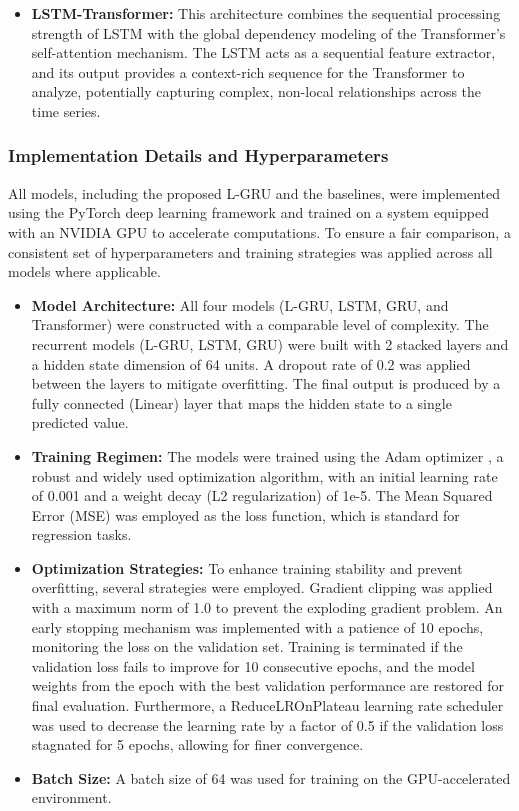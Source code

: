 \documentclass{cys}
\begin{document}
\begin{enumerate}
\begin{itemize}
        \item \textbf{LSTM-Transformer:}
        This architecture combines the sequential processing strength of LSTM with the global dependency modeling of the Transformer's self-attention mechanism. The LSTM acts as a sequential feature extractor, and its output provides a context-rich sequence for the Transformer to analyze, potentially capturing complex, non-local relationships across the time series.
    \end{itemize}

    
\subsubsection{Implementation Details and Hyperparameters}
    
    All models, including the proposed L-GRU and the baselines, were implemented using the PyTorch deep learning framework and trained on a system equipped with an NVIDIA GPU to accelerate computations. To ensure a fair comparison, a consistent set of hyperparameters and training strategies was applied across all models where applicable.
    \begin{itemize}
        \item \textbf{Model Architecture:}
        All four models (L-GRU, LSTM, GRU, and Transformer) were constructed with a comparable level of complexity. The recurrent models (L-GRU, LSTM, GRU) were built with 2 stacked layers and a hidden state dimension of 64 units. A dropout rate of 0.2 was applied between the layers to mitigate overfitting. The final output is produced by a fully connected (Linear) layer that maps the hidden state to a single predicted value.
        \item \textbf{Training Regimen:}
        The models were trained using the Adam optimizer \cite{kingma2014adam}, a robust and widely used optimization algorithm, with an initial learning rate of 0.001 and a weight decay (L2 regularization) of 1e-5. The Mean Squared Error (MSE) was employed as the loss function, which is standard for regression tasks.
        \item \textbf{Optimization Strategies:}
        To enhance training stability and prevent overfitting, several strategies were employed. Gradient clipping was applied with a maximum norm of 1.0 to prevent the exploding gradient problem. An early stopping mechanism was implemented with a patience of 10 epochs, monitoring the loss on the validation set. Training is terminated if the validation loss fails to improve for 10 consecutive epochs, and the model weights from the epoch with the best validation performance are restored for final evaluation. Furthermore, a ReduceLROnPlateau learning rate scheduler was used to decrease the learning rate by a factor of 0.5 if the validation loss stagnated for 5 epochs, allowing for finer convergence.
        \item \textbf{Batch Size:}
        A batch size of 64 was used for training on the GPU-accelerated environment.
    \end{itemize}
    



\end{enumerate}
\end{document}
